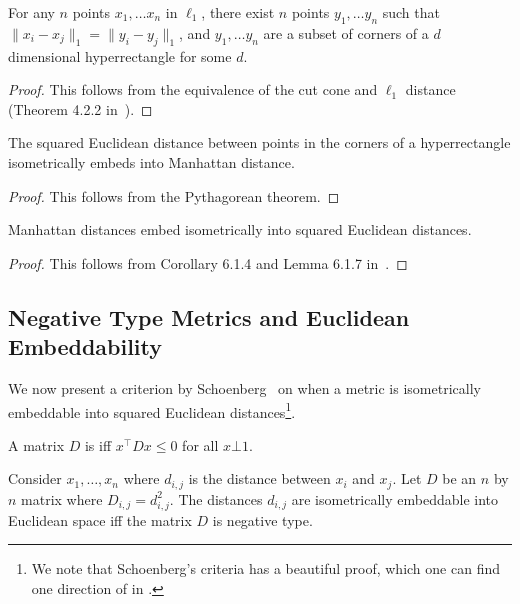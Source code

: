     \begin{lemma}\label{lem:l1-hyperrectangle} For any $n$ points $x_1, \ldots x_n$ in $\ell_1$,
      there exist $n$ points $y_1, \ldots y_n$ such that $\|x_i-
      x_j\|_1 = \|y_i - y_j\|_1$, and $y_1, \ldots y_n$ are a subset of corners of a
      $d$ dimensional hyperrectangle for some $d$. 
    \end{lemma}
    \begin{proof} 
      This follows from the equivalence of the cut cone and $\ell_1$
      distance (Theorem 4.2.2 in~\cite{dl09}).
    \end{proof}
    \begin{lemma}\label{lem:l2-hyperrectangle}
The squared Euclidean distance between points in the corners of a hyperrectangle
    isometrically embeds into Manhattan distance.
    \end{lemma}
    \begin{proof} 
      This follows from the Pythagorean theorem.
    \end{proof}



\begin{lemma} \label{lem:l1-iso}
  Manhattan distances embed isometrically into squared Euclidean
  distances.
\end{lemma}
\begin{proof} This follows from Corollary 6.1.4 and Lemma 6.1.7
in~\cite{dl09}. \end{proof}

\subsection{Negative Type Metrics and Euclidean Embeddability}\label{sec:preli:negative}
We now present a criterion by Schoenberg~\cite{s35} on when
a metric is isometrically embeddable into squared Euclidean
distances\footnote{
We note that Schoenberg's criteria has a beautiful proof, which one can
find one direction of in \cite{note}.
}.

\begin{definition} A matrix $D$ is  iff $x^{\top} D x
  \leq 0$ for all $x \bot 1$.
\end{definition}

\begin{lemma}\label{lem:euc}  
Consider $x_1,\ldots, x_n$ where $d_{i,j}$ is the distance between $x_i$ and $x_j$.  Let $D$ be an $n$ by $n$
  matrix where $D_{i,j} = d_{i,j}^2$.  The distances $d_{i,j}$ are
  isometrically embeddable into Euclidean space iff the matrix $D$ is
  negative type.
\end{lemma}

